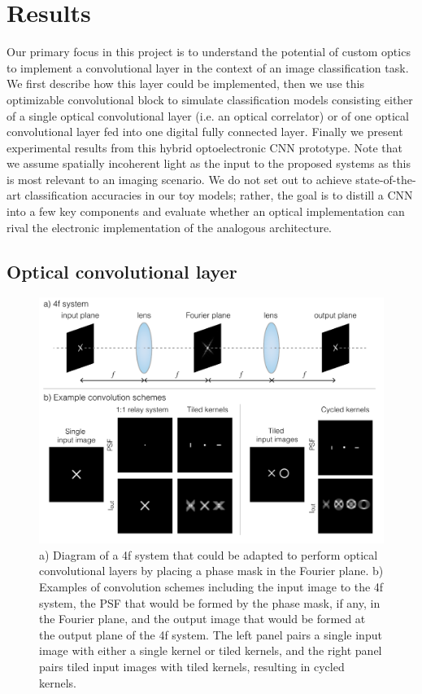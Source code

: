 \documentclass[fleqn,10pt]{wlscirep}
\begin{document}
\section*{Results}
Our primary focus in this project is to understand the potential of custom optics to implement a convolutional layer in the context of an image classification task. We first describe how this layer could be implemented, then we use this optimizable convolutional block to simulate classification models consisting either of a single optical convolutional layer (i.e. an optical correlator) or of one optical convolutional layer fed into one digital fully connected layer. Finally we present experimental results from this hybrid optoelectronic CNN prototype. Note that we assume spatially incoherent light as the input to the proposed systems as this is most relevant to an imaging scenario. We do not set out to achieve state-of-the-art classification accuracies in our toy models; rather, the goal is to distill a CNN into a few key components and evaluate whether an optical implementation can rival the electronic implementation of the analogous architecture. 


\subsection*{Optical convolutional layer}

\begin{figure}[t]
\centering
\includegraphics[width=.85\linewidth]{convolution.pdf}
\caption{a) Diagram of a 4f system that could be adapted to perform optical convolutional layers by placing a phase mask in the Fourier plane. b) Examples of convolution schemes including the input image to the 4f system, the PSF that would be formed by the phase mask, if any, in the Fourier plane, and the output image that would be formed at the output plane of the 4f system. The left panel pairs a single input image with either a single kernel or tiled kernels, and the right panel pairs tiled input images with tiled kernels, resulting in cycled kernels.}
\label{fig:convolution}
\end{figure}
\end{document}
